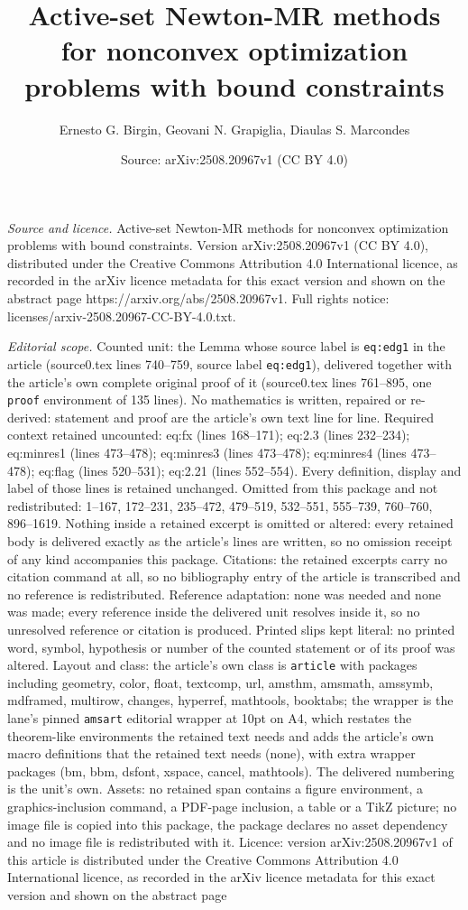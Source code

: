 \documentclass[10pt,a4paper]{amsart}
\title[Active-set Newton-MR methods for nonconvex optimization prob]{Active-set Newton-MR methods for nonconvex optimization problems with bound constraints}
\author{Ernesto G. Birgin, Geovani N. Grapiglia, Diaulas S. Marcondes}
\date{Source: arXiv:2508.20967v1 (CC BY 4.0)}
\begin{document}
\maketitle

\noindent\emph{Source and licence.} Active-set Newton-MR methods for nonconvex optimization problems with bound constraints. Version arXiv:2508.20967v1 (CC BY 4.0), distributed under the Creative Commons Attribution 4.0 International licence, as recorded in the arXiv licence metadata for this exact version and shown on the abstract page https://arxiv.org/abs/2508.20967v1. Full rights notice: licenses/arxiv-2508.20967-CC-BY-4.0.txt.\par\smallskip

\noindent\textit{Editorial scope.} Counted unit: the Lemma whose source label is \texttt{eq:edg1} in the article (source0.tex lines 740--759, source label \texttt{eq:edg1}), delivered together with the article's own complete original proof of it (source0.tex lines 761--895, one \texttt{proof} environment of 135 lines). No mathematics is written, repaired or re-derived: statement and proof are the article's own text line for line. Required context retained uncounted: eq:fx (lines 168--171); eq:2.3 (lines 232--234); eq:minres1 (lines 473--478); eq:minres3 (lines 473--478); eq:minres4 (lines 473--478); eq:flag (lines 520--531); eq:2.21 (lines 552--554). Every definition, display and label of those lines is retained unchanged. Omitted from this package and not redistributed: 1--167, 172--231, 235--472, 479--519, 532--551, 555--739, 760--760, 896--1619. Nothing inside a retained excerpt is omitted or altered: every retained body is delivered exactly as the article's lines are written, so no omission receipt of any kind accompanies this package. Citations: the retained excerpts carry no citation command at all, so no bibliography entry of the article is transcribed and no reference is redistributed. Reference adaptation: none was needed and none was made; every reference inside the delivered unit resolves inside it, so no unresolved reference or citation is produced. Printed slips kept literal: no printed word, symbol, hypothesis or number of the counted statement or of its proof was altered. Layout and class: the article's own class is \texttt{article} with packages including geometry, color, float, textcomp, url, amsthm, amsmath, amssymb, mdframed, multirow, changes, hyperref, mathtools, booktabs; the wrapper is the lane's pinned \texttt{amsart} editorial wrapper at 10pt on A4, which restates the theorem-like environments the retained text needs and adds the article's own macro definitions that the retained text needs (none), with extra wrapper packages (bm, bbm, dsfont, xspace, cancel, mathtools). The delivered numbering is the unit's own. Assets: no retained span contains a figure environment, a graphics-inclusion command, a PDF-page inclusion, a table or a TikZ picture; no image file is copied into this package, the package declares no asset dependency and no image file is redistributed with it. Licence: version arXiv:2508.20967v1 of this article is distributed under the Creative Commons Attribution 4.0 International licence, as recorded in the arXiv licence metadata for this exact version and shown on the abstract page 
\end{document}
